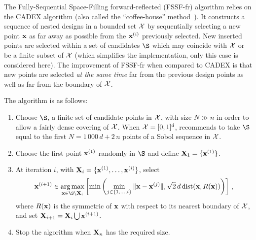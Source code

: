 The Fully-Sequential Space-Filling forward-reflected (FSSF-fr) algorithm \cite{shaapl21} relies on the CADEX algorithm \cite{kensto69} (also called the ``coffee-house'' method~\cite{mul07}). It constructs a sequence of nested designs in a bounded set $\mathcal{X}$ by sequentially selecting a new point ${\bf x}$ as far away as possible from the ${\bf x}^{(i)}$ previously selected. New inserted points are selected within a set of candidates $\S$ which may coincide with $\mathcal{X}$ or be a finite subset of $\mathcal{X}$ (which simplifies the implementation, only this case is considered here). 
The improvement of FSSF-fr when compared to CADEX is that new points are selected {\em at the same time} far from the previous design points as well as  far from the boundary of $\mathcal{X}$.  

The algorithm is as follows:
\begin{enumerate}
    \item Choose $\S$, a finite set of candidate  points in $\mathcal{X}$, with size $N \gg n$ in order to allow a fairly dense covering of $\mathcal{X}$. When $\mathcal{X}=[0,1]^d$, \cite{shaapl21} recommends to take $\S$ equal to the first $N=1\,000\,d+2\,n$ points of a Sobol sequence in $\mathcal{X}$. 
    
    \item Choose the first point ${\bf x}^{(1)}$ randomly in $\S$ and define ${\bf X}_1 = \{{\bf x}^{(1)}\}$. 
    
    \item At iteration $i$, with ${\bf X}_i = \{{\bf x}^{(1)},\ldots, {\bf x}^{(i)}\}$, select
    \begin{equation}\label{eq:FSSF-fr}
        \bx^{(i+1)} \in \argmax_{\bx \in \S \setminus \bX_i} \left[ \min\left( \min_{j \in \{1,\ldots,i\}} \|\bx-\bx^{(j)}\|, \sqrt{2}\,d \,\mbox{dist}(\bx,R(\bx)) \right) \right]\,, 
    \end{equation}
    where $R({\bf x})$ is the symmetric of ${\bf x}$ with respect to its nearest boundary of $\mathcal{X}$,
    and set ${\bf X}_{i+1} = {\bf X}_i \bigcup {\bf x}^{(i+1)}$.
    
    \item Stop the algorithm when ${\bf X}_n$ has the required size.
\end{enumerate}

